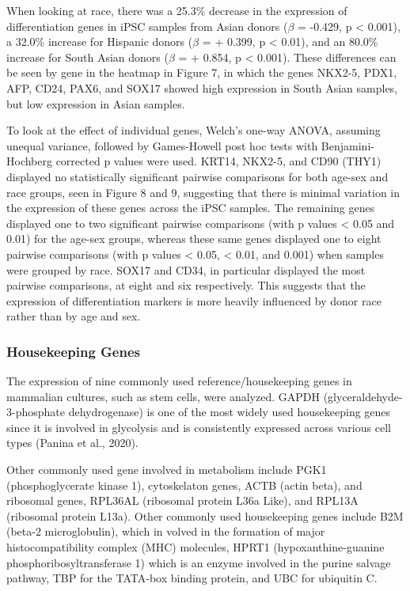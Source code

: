 \documentclass[
  letterpaper,
  DIV=11,
  numbers=noendperiod]{scrartcl}
\begin{document}
When looking at race, there was a 25.3\% decrease in the expression of
differentiation genes in iPSC samples from Asian donors (\(\beta\) =
-0.429, p \textless{} 0.001), a 32.0\% increase for Hispanic donors
(\(\beta\) = + 0.399, p \textless{} 0.01), and an 80.0\% increase for
South Asian donors (\(\beta\) = + 0.854, p \textless{} 0.001). These
differences can be seen by gene in the heatmap in Figure 7, in which the
genes NKX2-5, PDX1, AFP, CD24, PAX6, and SOX17 showed high expression in
South Asian samples, but low expression in Asian samples.

To look at the effect of individual genes, Welch's one-way ANOVA,
assuming unequal variance, followed by Games-Howell post hoc tests with
Benjamini-Hochberg corrected p values were used. KRT14, NKX2-5, and CD90
(THY1) displayed no statistically significant pairwise comparisons for
both age-sex and race groups, seen in Figure 8 and 9, suggesting that
there is minimal variation in the expression of these genes across the
iPSC samples. The remaining genes displayed one to two significant
pairwise comparisons (with p values \textless{} 0.05 and 0.01) for the
age-sex groups, whereas these same genes displayed one to eight pairwise
comparisons (with p values \textless{} 0.05, \textless{} 0.01, and
0.001) when samples were grouped by race. SOX17 and CD34, in particular
displayed the most pairwise comparisons, at eight and six respectively.
This suggests that the expression of differentiation markers is more
heavily influenced by donor race rather than by age and sex.

\subsubsection{Housekeeping Genes}\label{housekeeping-genes}

The expression of nine commonly used reference/housekeeping genes in
mammalian cultures, such as stem cells, were analyzed. GAPDH
(glyceraldehyde-3-phosphate dehydrogenase) is one of the most widely
used housekeeping genes since it is involved in glycolysis and is
consistently expressed across various cell types (Panina et al., 2020).

Other commonly used gene involved in metabolism include PGK1
(phosphoglycerate kinase 1), cytoskelaton genes, ACTB (actin beta), and
ribosomal genes, RPL36AL (ribosomal protein L36a Like), and RPL13A
(ribosomal protein L13a). Other commonly used housekeeping genes include
B2M (beta-2 microglobulin), which in volved in the formation of major
histocompatibility complex (MHC) molecules, HPRT1 (hypoxanthine-guanine
phosphoribosyltransferase 1) which is an enzyme involved in the purine
salvage pathway, TBP for the TATA-box binding protein, and UBC for
ubiquitin C.
\end{document}
